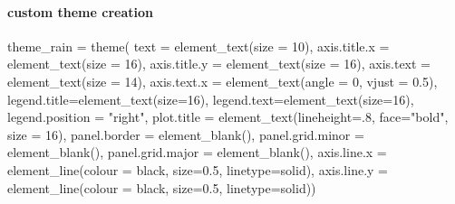 \documentclass[
]{article}
\newenvironment{Shaded}{\begin{snugshade}}{\end{snugshade}}
\newcommand{\AttributeTok}[1]{\textcolor[rgb]{0.77,0.63,0.00}{#1}}
\newcommand{\DecValTok}[1]{\textcolor[rgb]{0.00,0.00,0.81}{#1}}
\newcommand{\FloatTok}[1]{\textcolor[rgb]{0.00,0.00,0.81}{#1}}
\newcommand{\FunctionTok}[1]{\textcolor[rgb]{0.00,0.00,0.00}{#1}}
\newcommand{\NormalTok}[1]{#1}
\newcommand{\OtherTok}[1]{\textcolor[rgb]{0.56,0.35,0.01}{#1}}
\newcommand{\StringTok}[1]{\textcolor[rgb]{0.31,0.60,0.02}{#1}}
\begin{document}
\hypertarget{custom-theme-creation}{%
\paragraph{custom theme creation}\label{custom-theme-creation}}

\begin{Shaded}
\begin{Highlighting}[]
\NormalTok{theme\_rain }\OtherTok{=} \FunctionTok{theme}\NormalTok{(}
\AttributeTok{text =} \FunctionTok{element\_text}\NormalTok{(}\AttributeTok{size =} \DecValTok{10}\NormalTok{),}
\AttributeTok{axis.title.x =} \FunctionTok{element\_text}\NormalTok{(}\AttributeTok{size =} \DecValTok{16}\NormalTok{),}
\AttributeTok{axis.title.y =} \FunctionTok{element\_text}\NormalTok{(}\AttributeTok{size =} \DecValTok{16}\NormalTok{),}
\AttributeTok{axis.text =} \FunctionTok{element\_text}\NormalTok{(}\AttributeTok{size =} \DecValTok{14}\NormalTok{),}
\AttributeTok{axis.text.x =} \FunctionTok{element\_text}\NormalTok{(}\AttributeTok{angle =} \DecValTok{0}\NormalTok{, }\AttributeTok{vjust =} \FloatTok{0.5}\NormalTok{),}
\AttributeTok{legend.title=}\FunctionTok{element\_text}\NormalTok{(}\AttributeTok{size=}\DecValTok{16}\NormalTok{),}
\AttributeTok{legend.text=}\FunctionTok{element\_text}\NormalTok{(}\AttributeTok{size=}\DecValTok{16}\NormalTok{),}
\AttributeTok{legend.position =} \StringTok{"right"}\NormalTok{,}
\AttributeTok{plot.title =} \FunctionTok{element\_text}\NormalTok{(}\AttributeTok{lineheight=}\NormalTok{.}\DecValTok{8}\NormalTok{, }\AttributeTok{face=}\StringTok{"bold"}\NormalTok{, }\AttributeTok{size =} \DecValTok{16}\NormalTok{),}
\AttributeTok{panel.border =} \FunctionTok{element\_blank}\NormalTok{(),}
\AttributeTok{panel.grid.minor =} \FunctionTok{element\_blank}\NormalTok{(),}
\AttributeTok{panel.grid.major =} \FunctionTok{element\_blank}\NormalTok{(),}
\AttributeTok{axis.line.x =} \FunctionTok{element\_line}\NormalTok{(}\AttributeTok{colour =} \StringTok{\textquotesingle{}black\textquotesingle{}}\NormalTok{, }\AttributeTok{size=}\FloatTok{0.5}\NormalTok{, }\AttributeTok{linetype=}\StringTok{\textquotesingle{}solid\textquotesingle{}}\NormalTok{),}
\AttributeTok{axis.line.y =} \FunctionTok{element\_line}\NormalTok{(}\AttributeTok{colour =} \StringTok{\textquotesingle{}black\textquotesingle{}}\NormalTok{, }\AttributeTok{size=}\FloatTok{0.5}\NormalTok{, }\AttributeTok{linetype=}\StringTok{\textquotesingle{}solid\textquotesingle{}}\NormalTok{))}
\end{Highlighting}
\end{Shaded}
\end{document}
